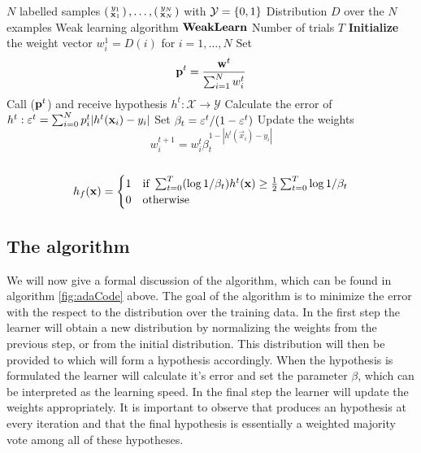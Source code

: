 \begin{algorithm} 
\caption{\adaB}
\label{fig:adaCode}
	\begin{algorithmic}[1]
	\Require 
	\Statex $N$ labelled samples $\Vec{y_1\\ \mathbf x_1},\ldots,\Vec{y_N\\ \mathbf x_N}$  with $\mathcal Y = \set{0,1}$ 
	\Statex Distribution $D$ over the $N$ examples
	\Statex Weak learning algorithm $\weak$
	\Statex Number of trials $T$
	\State \textbf{Initialize} the weight vector $w_i^1=D(i)$ for $i=1,\ldots,N$
	\State Set $$\bf p^t= \frac{\bf w^t}{\sum_{i=1}^N w^t_i}$$
	\State Call \weak($\bf p^t$) and receive hypothesis $h^t:\mathcal X\to\mathcal Y$
	\State Calculate the error of $h^t:\ve^t=\sum^N_{i=0}p^t_i|h^t(\mathbf x_i)-y_i|$
	\State Set $\b_t=\ve^t/(1-\ve^t)$
	\State Update the weights $$w_i^{t+1}=w_i^t\beta^{1-|h^t(\vec x_i)-y_i|}_t$$
	\EndFor\\
	\Return $$h_f(\mathbf x)=\begin{cases}1 & \text{if } \sum^T_{t=0}(\log1/\b_t)h^t(\mathbf x)\geq\frac12\sum^T_{t=0}\log1/\b_t\\0&\text{otherwise}\end{cases}$$
	\EndProcedure
	\end{algorithmic}
\end{algorithm}
\subsection{The algorithm}
\label{subsec:AdaAlgo}
We will now give a formal discussion of the \adaB\cite{Freund1997} algorithm, which can be found in algorithm \ref{fig:adaCode} above. The goal of the algorithm is to minimize the error with the respect to the distribution 
over the training data. In the first step the learner will obtain a new distribution by normalizing the weights from the previous step, or from the initial distribution. This distribution will then be provided to \weak which will form a hypothesis accordingly. When the hypothesis is formulated the learner will calculate it's error and set the parameter $\beta$, which can be interpreted as the learning speed. In the final step the learner will update the weights appropriately. It is important to observe that \weak produces an hypothesis at every iteration and that the final hypothesis is essentially a weighted majority vote among all of these hypotheses. 

